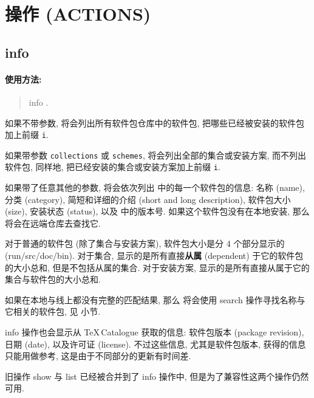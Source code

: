 \section[操作]{操作 (ACTIONS)}

\subsection{\mdseries\ac{info}}\label{subsec:info}

\paragraph{使用方法:}


\begin{quote}
    \tlmgr{} \ac{info} .
\end{quote}

如果不带参数, 将会列出所有软件包仓库中的软件包, 把哪些已经被安装的软件包加上前缀 \texttt{i}.

如果带参数 \texttt{collections} 或 \texttt{schemes}, 将会列出全部的集合或安装方案, 而不列出软件包, 同样地, 把已经安装的集合或安装方案加上前缀 \texttt{i}. 

如果带了任意其他的参数, 将会依次列出  中的每一个软件包的信息: 名称 (name), 分类 (category), 简短和详细的介绍 (short and long description), 软件包大小 (size), 安装状态 (status), 以及 \tl 中的版本号. 如果这个软件包没有在本地安装, 那么 \tlmgr 将会在远端仓库去查找它. 

对于普通的软件包 (除了集合与安装方案), 软件包大小是分 4 个部分显示的 (run/src/doc/bin). 对于集合, 显示的是所有直接\textbf{从属} (dependent) 于它的软件包的大小总和, 但是不包括从属的集合. 对于安装方案, 显示的是所有直接从属于它的集合与软件包的大小总和. 

如果在本地与线上都没有完整的匹配结果, 那么 \tlmgr 将会使用 \ac{search} 操作寻找名称与它相关的软件包, 见  小节. 

\ac{info} 操作也会显示从 \TeX\,Catalogue 获取的信息: 软件包版本 (package revision), 日期 (date), 以及许可证 (license). 不过这些信息, 尤其是软件包版本, 获得的信息只能用做参考, 这是由于不同部分的更新有时间差. 

旧操作 \ac{show} 与 \ac{list} 已经被合并到了 \ac{info} 操作中, 但是为了兼容性这两个操作仍然可用. 

